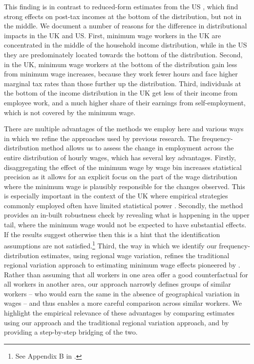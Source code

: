 This finding is in contrast to reduced-form estimates from the US \citep{Dube2019}, which find strong effects on post-tax incomes at the bottom of the distribution, but not in the middle. We document a number of reasons for the difference in distributional impacts in the UK and US. First, minimum wage workers in the UK are concentrated in the middle of the household income distribution, while in the US they are predominately located towards the bottom of the distribution. Second, in the UK, minimum wage workers at the bottom of the distribution gain less from minimum wage increases, because they work fewer hours and face higher marginal tax rates than those further up the distribution. Third, individuals at the bottom of the income distribution in the UK get less of their income from employee work, and a much higher share of their earnings from self-employment, which is not covered by the minimum wage.

There are multiple advantages of the methods we employ here and various ways in which we refine the approaches used by previous research. The frequency-distribution method allows us to assess the change in employment across the entire distribution of hourly wages, which has several key advantages. Firstly, disaggregating the effect of the minimum wage by wage bin increases statistical precision as it allows for an explicit focus on the part of the wage distribution where the minimum wage is plausibly responsible for the changes observed. This is especially important in the context of the UK where empirical strategies commonly employed often have limited statistical power \citep{Brewer2019}. Secondly, the method provides an in-built robustness check by revealing what is happening in the upper tail, where the minimum wage would not be expected to have substantial effects. If the results suggest otherwise then this is a hint that the identification assumptions are not satisfied.\footnote{See Appendix B in \citet{Cengiz2019}.} Third, the way in which we identify our frequency-distribution estimates, using regional wage variation, refines the traditional regional variation approach to estimating minimum wage effects pioneered by \citet{Card1992}. Rather than assuming that all workers in one area offer a good counterfactual for all workers in another area, our approach narrowly defines groups of similar workers -- who would earn the same in the absence of geographical variation in wages -- and thus enables a more careful comparison across similar workers. We highlight the empirical relevance of these advantages by comparing estimates using our approach and the traditional regional variation approach, and by providing a step-by-step bridging of the two.  \par

